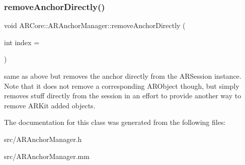 \subsubsection{\texorpdfstring{remove\+Anchor\+Directly()}{removeAnchorDirectly()}}
{\footnotesize\ttfamily void A\+R\+Core\+::\+A\+R\+Anchor\+Manager\+::remove\+Anchor\+Directly (\begin{DoxyParamCaption}\item[{int}]{index = {} }\end{DoxyParamCaption})}

same as above but removes the anchor directly from the A\+R\+Session instance. Note that it does not remove a corresponding A\+R\+Object though, but simply removes stuff directly from the session in an effort to provide another way to remove A\+R\+Kit added objects. 

The documentation for this class was generated from the following files\+:\begin{DoxyCompactItemize}
\item 
src/A\+R\+Anchor\+Manager.\+h\item 
src/A\+R\+Anchor\+Manager.\+mm\end{DoxyCompactItemize}
